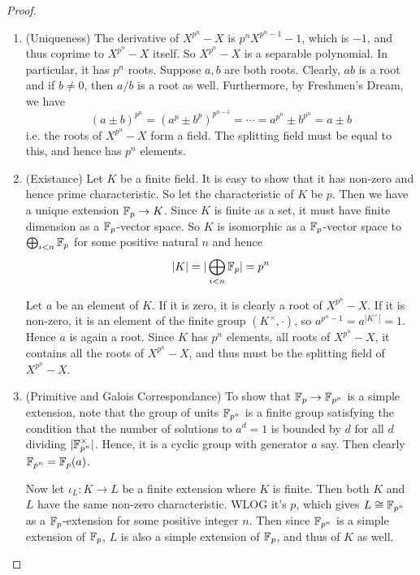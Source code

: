 \documentclass[../book.tex]{subfiles}
\begin{document}
\begin{proof}
    \begin{enumerate}
    
        \item (Uniqueness)
        The derivative of $X^{p^n} - X$ is $p^{n} X^{p^n - 1} -1$, 
        which is $-1$, and thus coprime to $X^{p^n} - X$ itself.
        So $X^{p^n} - X$ is a separable polynomial. 
        In particular, it has $p^n$ roots. 
        Suppose $a, b$ are both roots.
        Clearly, $ab$ is a root and if $b \neq 0$, then $a / b$ is a root as well.
        Furthermore, by Freshmen's Dream, we have \[
            (a \pm b)^{p^n} = (a^p \pm b^p)^{p^{n-1}} = \cdots
            = a^{p^n} \pm b^{p^n} = a \pm b
        \]
        i.e. the roots of $X^{p^n} - X$ form a field.
        The splitting field must be equal to this, and hence has $p^n$ elements.
        
        \item (Existance)
        Let $K$ be a finite field. 
        It is easy to show that it has non-zero and hence prime characteristic. 
        So let the characteristic of $K$ be $p$. 
        Then we have a unique extension $\mathbb{F}_p \to K$. 
        Since $K$ is finite as a set, 
        it must have finite dimension as a $\mathbb{F}_p$-vector space.
        So $K$ is isomorphic as a $\mathbb{F}_p$-vector space to $\bigoplus_{i < n} \mathbb{F}_p$ 
        for some positive natural $n$ and hence \[
            |K| = |\bigoplus_{i < n} \mathbb{F}_p| = p^n
        \]
        
        Let $a$ be an element of $K$.
        If it is zero, it is clearly a root of $X^{p^n} - X$.
        If it is non-zero, it is an element of the finite group $(K^\times,\cdot)$,
        so $a^{p^n - 1} = a^{|K^\times|} = 1$.
        Hence $a$ is again a root. 
        Since $K$ has $p^n$ elements, all roots of $X^{p^n} - X$, 
        it contains all the roots of $X^{p^n} - X$,
        and thus must be the splitting field of $X^{p^n} - X$.
        
        \item (Primitive and Galois Correspondance)
        To show that $\mathbb{F}_p \to \mathbb{F}_{p^n}$ is a simple extension,
        note that the group of units $\mathbb{F}_{p^n}$ is a finite group
        satisfying the condition that the number of solutions to $a^d = 1$ 
        is bounded by $d$ for all $d$ dividing $|\mathbb{F}_{p^n}^\times|$. 
        Hence, it is a cyclic group with generator $a$ say. 
        Then clearly $\mathbb{F}_{p^n} = \mathbb{F}_p(a)$. 
        
        Now let $\iota_L : K \to L$ be a finite extension where $K$ is finite.
        Then both $K$ and $L$ have the same non-zero characteristic.
        WLOG it's $p$, which gives $L \cong \mathbb{F}_{p^n}$ as a $\mathbb{F}_p$-extension
        for some positive integer $n$. 
        Then since $\mathbb{F}_{p^n}$ is a simple extension of $\mathbb{F}_p$,
        $L$ is also a simple extension of $\mathbb{F}_p$,
        and thus of $K$ as well. 
        

\end{enumerate}
\end{proof}
\end{document}
